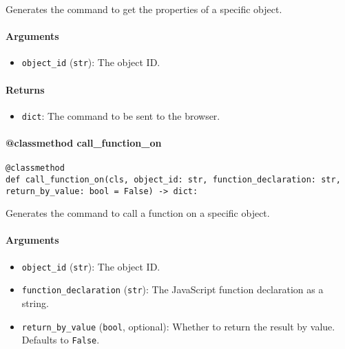 \documentclass{article}
\begin{document}
\noindent Generates the command to get the properties of a specific object.

\paragraph{Arguments}

\begin{itemize}
    \item \lstinline[style=pythonstyle]|object_id| (\lstinline[style=pythonstyle]|str|): The object ID.
\end{itemize}

\paragraph{Returns}

\begin{itemize}
    \item \lstinline[style=pythonstyle]|dict|: The command to be sent to the browser.
\end{itemize}

\paragraph{@classmethod call\_function\_on}

\begin{lstlisting}[style=pythonstyle]
@classmethod
def call_function_on(cls, object_id: str, function_declaration: str, return_by_value: bool = False) -> dict:
\end{lstlisting}

\noindent Generates the command to call a function on a specific object.

\paragraph{Arguments}

\begin{itemize}
    \item \lstinline[style=pythonstyle]|object_id| (\lstinline[style=pythonstyle]|str|): The object ID.
    \item \lstinline[style=pythonstyle]|function_declaration| (\lstinline[style=pythonstyle]|str|): The JavaScript function declaration as a string.
    \item \lstinline[style=pythonstyle]|return_by_value| (\lstinline[style=pythonstyle]|bool|, optional): Whether to return the result by value. Defaults to \lstinline[style=pythonstyle]|False|.
\end{itemize}
\end{document}

